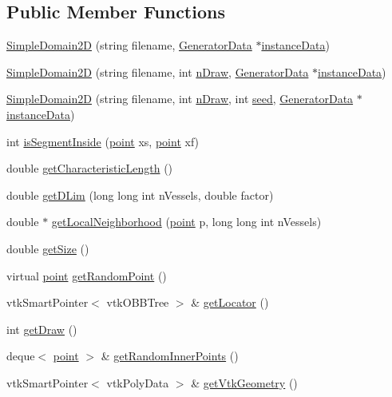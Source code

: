 \subsection*{Public Member Functions}
\begin{DoxyCompactItemize}
\item 
\hyperlink{class_simple_domain2_d_a08c1cec51a7bc1d3cc7e65f8f1346bef}{Simple\+Domain2D} (string filename, \hyperlink{class_generator_data}{Generator\+Data} $\ast$\hyperlink{class_abstract_domain_aa37fbabc2bfa92c574f7db7544016b53}{instance\+Data})
\item 
\hyperlink{class_simple_domain2_d_a52afa98107cdf2888d4ce006354b53d9}{Simple\+Domain2D} (string filename, int \hyperlink{class_simple_domain2_d_ad541f350ae7423116545f4363f8d0715}{n\+Draw}, \hyperlink{class_generator_data}{Generator\+Data} $\ast$\hyperlink{class_abstract_domain_aa37fbabc2bfa92c574f7db7544016b53}{instance\+Data})
\item 
\hyperlink{class_simple_domain2_d_ad36b389b52d7341010d181986de0b9a0}{Simple\+Domain2D} (string filename, int \hyperlink{class_simple_domain2_d_ad541f350ae7423116545f4363f8d0715}{n\+Draw}, int \hyperlink{class_simple_domain2_d_abca10a88602d74c02d5d94651d9fc8bd}{seed}, \hyperlink{class_generator_data}{Generator\+Data} $\ast$\hyperlink{class_abstract_domain_aa37fbabc2bfa92c574f7db7544016b53}{instance\+Data})
\item 
int \hyperlink{class_simple_domain2_d_a18706cdbe4f61a71eceb7257fd4ec6dd}{is\+Segment\+Inside} (\hyperlink{structpoint}{point} xs, \hyperlink{structpoint}{point} xf)
\item 
double \hyperlink{class_simple_domain2_d_a5bf4df64fe80dae1e394b2f2c73c3d05}{get\+Characteristic\+Length} ()
\item 
double \hyperlink{class_simple_domain2_d_a60dbee1351f604d7ee61121d923de823}{get\+D\+Lim} (long long int n\+Vessels, double factor)
\item 
double $\ast$ \hyperlink{class_simple_domain2_d_a5c7eaa0e32e25950149c4735bd02c671}{get\+Local\+Neighborhood} (\hyperlink{structpoint}{point} p, long long int n\+Vessels)
\item 
double \hyperlink{class_simple_domain2_d_ad5e1ba1529fd8088f64af603cc5c18a3}{get\+Size} ()
\item 
virtual \hyperlink{structpoint}{point} \hyperlink{class_simple_domain2_d_a8b19e2fa69a0f13813b0296f270f11e9}{get\+Random\+Point} ()
\item 
vtk\+Smart\+Pointer$<$ vtk\+O\+B\+B\+Tree $>$ \& \hyperlink{class_simple_domain2_d_a09fc603691f205b49d975aab902cdef4}{get\+Locator} ()
\item 
int \hyperlink{class_simple_domain2_d_a15b519453137710f0c8897a4eda7c25d}{get\+Draw} ()
\item 
deque$<$ \hyperlink{structpoint}{point} $>$ \& \hyperlink{class_simple_domain2_d_a08eddf131c1ed43cf7cc34e347fd372f}{get\+Random\+Inner\+Points} ()
\item 
vtk\+Smart\+Pointer$<$ vtk\+Poly\+Data $>$ \& \hyperlink{class_simple_domain2_d_a0c4505e70d9530586bcb0ab943bb9a9a}{get\+Vtk\+Geometry} ()
\end{DoxyCompactItemize}
